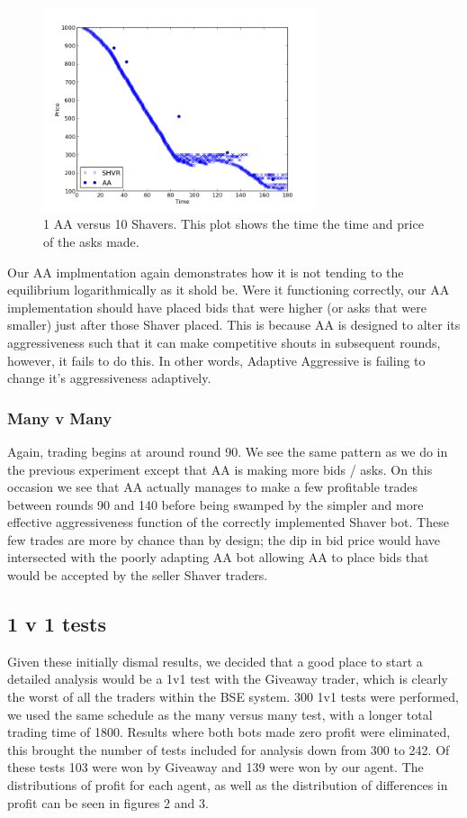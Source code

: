\documentclass{acm_proc_article-sp}
\begin{document}
\begin{figure}[h!] \includegraphics[width=80mm]{SHVR10AA1_180_all_asks.png}
\caption {1 AA versus 10 Shavers. This plot shows the time the time and price of the asks made.}
\end{figure}

Our AA implmentation again demonstrates how it is not tending to the
equilibrium logarithmically as it shold be. Were it functioning correctly, our
AA implementation should have placed bids that were higher (or asks that were
smaller) just after those Shaver placed. This is because AA is designed to
alter its aggressiveness such that it can make competitive shouts in subsequent
rounds, however, it fails to do this. In other words, Adaptive Aggressive is
failing to change it's aggressiveness adaptively.

\subsubsection{Many v Many} Again, trading begins at around round 90. We see
the same pattern as we do in the previous experiment except that AA is making
more bids / asks. On this occasion we see that AA actually manages to make a
few profitable trades between rounds 90 and 140 before being swamped by the
simpler and more effective aggressiveness function of the correctly implemented
Shaver bot. These few trades are more by chance than by design; the dip in bid
price would have intersected with the poorly adapting AA bot allowing AA to
place bids that would be accepted by the seller Shaver traders.

\subsection{1 v 1 tests} Given these initially dismal results, we decided that
a good place to start a detailed analysis would be a 1v1 test with the Giveaway
trader, which is clearly the worst of all the traders within the BSE system.
300 1v1 tests were performed, we used the same schedule as the many versus many
test, with a longer total trading time of 1800. Results where both bots made
zero profit were eliminated, this brought the number of tests included for
analysis down from 300 to 242. Of these tests 103 were won by Giveaway and 139
were won by our agent. The distributions of profit for each agent, as well as
the distribution of differences in profit can be seen in figures 2 and 3.
\end{document}
